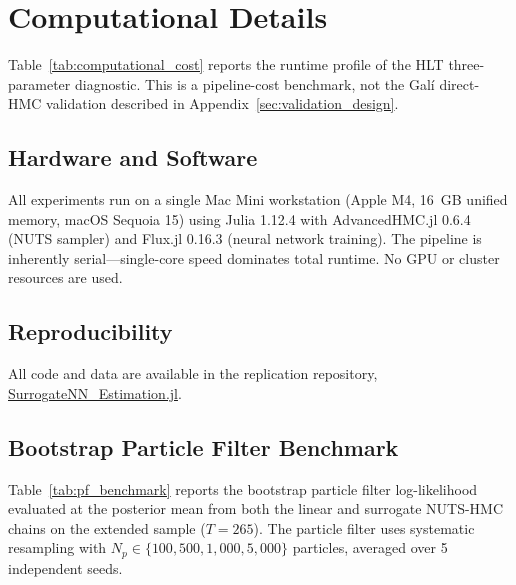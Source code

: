 \documentclass[12pt]{article}
\theoremstyle{plain}
\theoremstyle{definition}
\theoremstyle{remark}
\begin{document}
\section{Computational Details}
\label{app:computational}

Table~\ref{tab:computational_cost} reports the runtime profile of the HLT three-parameter diagnostic. This is a pipeline-cost benchmark, not the Gal\'i direct-HMC validation described in Appendix~\ref{sec:validation_design}.

\subsection{Hardware and Software}

All experiments run on a single Mac Mini workstation (Apple M4, 16~GB unified memory, macOS Sequoia 15) using Julia 1.12.4 with AdvancedHMC.jl 0.6.4 (NUTS sampler) and Flux.jl 0.16.3 (neural network training). The pipeline is inherently serial---single-core speed dominates total runtime. No GPU or cluster resources are used.

\subsection{Reproducibility}

All code and data are available in the replication repository, \href{https://github.com/matyasfarkas/SurrogateNN_Estimation.jl}{SurrogateNN\_Estimation.jl}.

\subsection{Bootstrap Particle Filter Benchmark}
\label{app:pf_benchmark}

Table~\ref{tab:pf_benchmark} reports the bootstrap particle filter log-likelihood evaluated at the posterior mean from both the linear and surrogate NUTS-HMC chains on the extended sample ($T = 265$). The particle filter uses systematic resampling \citep{gordon1993novel} with $N_p \in \{100, 500, 1{,}000, 5{,}000\}$ particles, averaged over 5 independent seeds.
\end{document}
